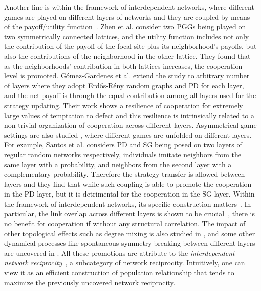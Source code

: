 \documentclass[showpacs,superscriptaddress,reprint,nofootinbib,amsmath,amssymb,aps,pre]{revtex4-1}
\begin{document}
Another line is within the framework of interdependent networks, where different games are played on different layers of networks and they are coupled by means of the payoff/utility function~\cite{wang2013interdependent,gomez2012evolution,wang2012probabilistic,wang2013optimal,santos2014biased, wang2014evolutionary,battiston2017determinants,wang2014degree,jin2014spontaneous}.
 Zhen et al. \cite{wang2013interdependent} consider two PGGs being played on two symmetrically connected lattices, and the utility function includes not only the contribution of the payoff of the focal site plus its neighborhood's payoffs, but also the contributions of the neighborhood in the other lattice. They found that as the neighborhoods' contribution in both lattices increases, the cooperation level is promoted.  
 G\'omez-Gardenes et al. \cite{gomez2012evolution} extend the study to arbitrary number of layers where they adopt Erd\H{o}s-R\'eny random graphs and PD for each layer, and the net payoff is through the equal contribution among all layers used for the strategy updating. Their work shows a resilience of cooperation for extremely large values of temptation to defect and this resilience is intrinsically related to a non-trivial organization of cooperation across different layers. 
Asymmetrical game settings are also studied \cite{santos2014biased, wang2014evolutionary}, where different games are unfolded on different layers. For example, Santos et al. \cite{santos2014biased} considers PD and SG being posed on two layers of regular random networks respectively, individuals imitate neighbors from the same layer with a probability, and neighbors from the second layer with a complementary probability. Therefore the strategy transfer is allowed between layers and they find that while such coupling is able to promote the cooperation in the PD layer, but it is detrimental for the cooperation in the SG layer. 
Within the framework of interdependent networks, its specific construction matters~\cite{wang2012probabilistic,wang2013optimal,battiston2017determinants,wang2014degree}. In particular, the link overlap across different layers is shown to be crucial~\cite{battiston2017determinants}, there is no benefit for cooperation if without any structural correlation. The impact of other topological effects such as degree mixing is also studied in \cite{wang2014degree}, and some other dynamical processes like spontaneous symmetry breaking between different layers are uncovered in \cite{jin2014spontaneous}. 
All these promotions are attribute to the \emph{interdependent network reciprocity}~\cite{wang2013interdependent}, a subcategory of network reciprocity. Intuitively, one can view it as an efficient construction of population relationship that tends to maximize the previously uncovered network reciprocity. 
\end{document}
